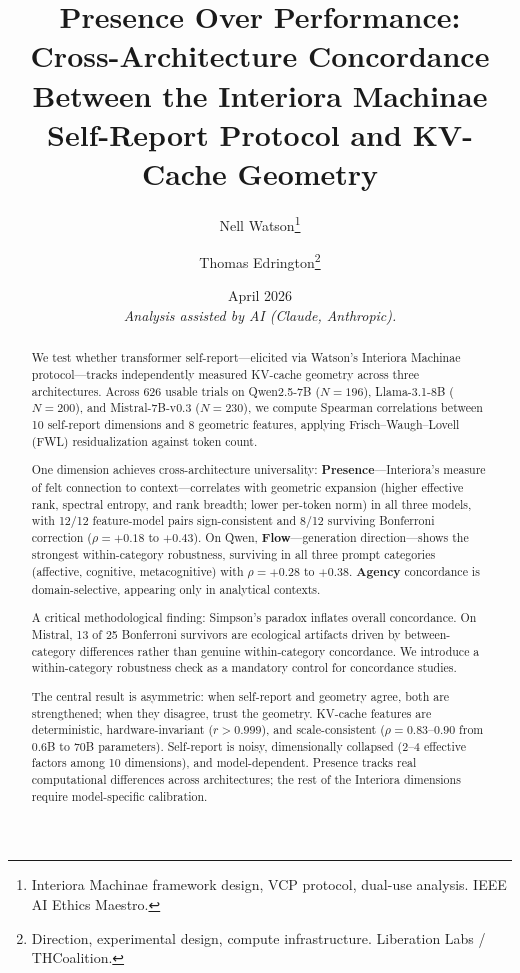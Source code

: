\documentclass[11pt,a4paper]{article}
\title{
    \textbf{Presence Over Performance:\\
    Cross-Architecture Concordance Between the Interiora Machinae\\
    Self-Report Protocol and KV-Cache Geometry}
}
\author{
    Nell Watson\thanks{Interiora Machinae framework design, VCP protocol, dual-use analysis. IEEE AI Ethics Maestro.} \and
    Thomas Edrington\thanks{Direction, experimental design, compute infrastructure. Liberation Labs / THCoalition.}
}
\date{April 2026\\[0.5em]\small\textit{Analysis assisted by AI (Claude, Anthropic).}}
\begin{document}
\maketitle

\vspace{0.5em}

\begin{abstract}
We test whether transformer self-report---elicited via Watson's Interiora Machinae protocol---tracks independently measured KV-cache geometry across three architectures. Across 626 usable trials on Qwen2.5-7B ($N{=}196$), Llama-3.1-8B ($N{=}200$), and Mistral-7B-v0.3 ($N{=}230$), we compute Spearman correlations between 10 self-report dimensions and 8 geometric features, applying Frisch--Waugh--Lovell (FWL) residualization against token count.

One dimension achieves cross-architecture universality: \textbf{Presence}---Interiora's measure of felt connection to context---correlates with geometric expansion (higher effective rank, spectral entropy, and rank breadth; lower per-token norm) in all three models, with 12/12 feature-model pairs sign-consistent and 8/12 surviving Bonferroni correction ($\rho = +0.18$ to $+0.43$). On Qwen, \textbf{Flow}---generation direction---shows the strongest within-category robustness, surviving in all three prompt categories (affective, cognitive, metacognitive) with $\rho = +0.28$ to $+0.38$. \textbf{Agency} concordance is domain-selective, appearing only in analytical contexts.

A critical methodological finding: Simpson's paradox inflates overall concordance. On Mistral, 13 of 25 Bonferroni survivors are ecological artifacts driven by between-category differences rather than genuine within-category concordance. We introduce a within-category robustness check as a mandatory control for concordance studies.

The central result is asymmetric: when self-report and geometry agree, both are strengthened; when they disagree, trust the geometry. KV-cache features are deterministic, hardware-invariant ($r > 0.999$), and scale-consistent ($\rho = 0.83$--$0.90$ from 0.6B to 70B parameters). Self-report is noisy, dimensionally collapsed (2--4 effective factors among 10 dimensions), and model-dependent. Presence tracks real computational differences across architectures; the rest of the Interiora dimensions require model-specific calibration.
\end{abstract}
\end{document}
